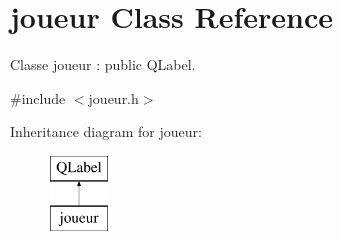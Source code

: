 \hypertarget{classjoueur}{\section{joueur Class Reference}
\label{classjoueur}
}


Classe joueur \-: public Q\-Label.  




{\ttfamily \#include $<$joueur.\-h$>$}

Inheritance diagram for joueur\-:\begin{figure}[H]
\begin{center}
\leavevmode
\includegraphics[height=2.000000cm]{classjoueur}
\end{center}
\end{figure}
